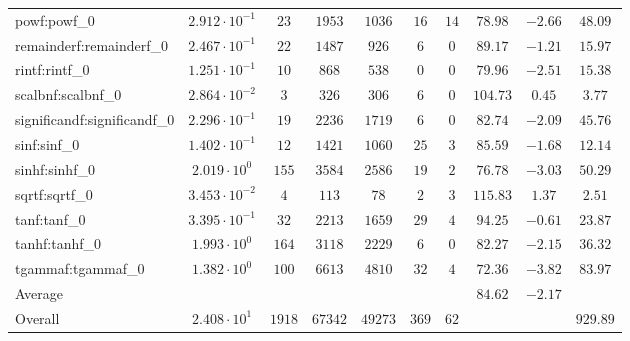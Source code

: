 \begin{tabular}{|l|c|c|c|c|c|c|c|c|c|}
powf:powf\_0                 & $ 2.912 \cdot 10^{-1} $ & $ 23     $ & $ 1953  $ & $ 1036  $ & $ 16  $ & $ 14 $ & $ 78.98       $ & $ -2.66   $ & $ 48.09   $ \\
remainderf:remainderf\_0     & $ 2.467 \cdot 10^{-1} $ & $ 22     $ & $ 1487  $ & $ 926   $ & $ 6   $ & $ 0  $ & $ 89.17       $ & $ -1.21   $ & $ 15.97   $ \\
rintf:rintf\_0               & $ 1.251 \cdot 10^{-1} $ & $ 10     $ & $ 868   $ & $ 538   $ & $ 0   $ & $ 0  $ & $ 79.96       $ & $ -2.51   $ & $ 15.38   $ \\
scalbnf:scalbnf\_0           & $ 2.864 \cdot 10^{-2} $ & $ 3      $ & $ 326   $ & $ 306   $ & $ 6   $ & $ 0  $ & $ 104.73      $ & $ 0.45    $ & $ 3.77    $ \\
significandf:significandf\_0 & $ 2.296 \cdot 10^{-1} $ & $ 19     $ & $ 2236  $ & $ 1719  $ & $ 6   $ & $ 0  $ & $ 82.74       $ & $ -2.09   $ & $ 45.76   $ \\
sinf:sinf\_0                 & $ 1.402 \cdot 10^{-1} $ & $ 12     $ & $ 1421  $ & $ 1060  $ & $ 25  $ & $ 3  $ & $ 85.59       $ & $ -1.68   $ & $ 12.14   $ \\
sinhf:sinhf\_0               & $ 2.019 \cdot 10^{0}  $ & $ 155    $ & $ 3584  $ & $ 2586  $ & $ 19  $ & $ 2  $ & $ 76.78       $ & $ -3.03   $ & $ 50.29   $ \\
sqrtf:sqrtf\_0               & $ 3.453 \cdot 10^{-2} $ & $ 4      $ & $ 113   $ & $ 78    $ & $ 2   $ & $ 3  $ & $ 115.83      $ & $ 1.37    $ & $ 2.51    $ \\
tanf:tanf\_0                 & $ 3.395 \cdot 10^{-1} $ & $ 32     $ & $ 2213  $ & $ 1659  $ & $ 29  $ & $ 4  $ & $ 94.25       $ & $ -0.61   $ & $ 23.87   $ \\
tanhf:tanhf\_0               & $ 1.993 \cdot 10^{0}  $ & $ 164    $ & $ 3118  $ & $ 2229  $ & $ 6   $ & $ 0  $ & $ 82.27       $ & $ -2.15   $ & $ 36.32   $ \\
tgammaf:tgammaf\_0           & $ 1.382 \cdot 10^{0}  $ & $ 100    $ & $ 6613  $ & $ 4810  $ & $ 32  $ & $ 4  $ & $ 72.36       $ & $ -3.82   $ & $ 83.97   $ \\
\hline
Average                      & $                     $ & $        $ & $       $ & $       $ & $     $ & $    $ & $ 84.62       $ & $ -2.17   $ & $         $ \\
\hline
Overall                      & $ 2.408 \cdot 10^{1}  $ & $ 1918   $ & $ 67342 $ & $ 49273 $ & $ 369 $ & $ 62 $ & $             $ & $         $ & $ 929.89  $ \\
\hline
\end{tabular}
